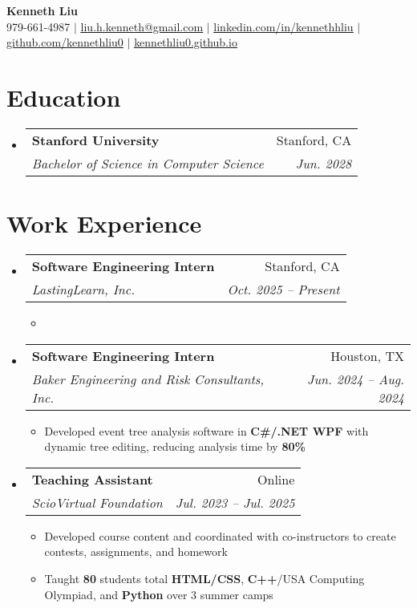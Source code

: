 \documentclass[letterpaper,11pt]{article}
\makeatletter
\newcommand{\resumeItem}[1]{
  \item\small{
    {#1 \vspace{-2pt}}
  }
}
\newcommand{\resumeSubheading}[4]{
  \vspace{-2pt}\item
    \begin{tabular*}{0.97\textwidth}[t]{l@{\extracolsep{\fill}}r}
      \textbf{#1} & #2 \\
      \textit{\small#3} & \textit{\small #4} \\
    \end{tabular*}\vspace{-7pt}
}
\newcommand{\resumeSubHeadingListStart}{\begin{itemize}[leftmargin=0.15in, label={}]}
\newcommand{\resumeSubHeadingListEnd}{\end{itemize}}
\newcommand{\resumeItemListStart}{\begin{itemize}}
\newcommand{\resumeItemListEnd}{\end{itemize}\vspace{-5pt}}
\makeatother
\begin{document}

\begin{center}
    \textbf{\Huge  Kenneth Liu} \\ \vspace{1pt}
    \small 979-661-4987 $|$ \href{mailto:liu.h.kenneth@gmail.com}{\underline{liu.h.kenneth@gmail.com}} $|$ 
    \href{https://www.linkedin.com/in/kennethhliu}{\underline{linkedin.com/in/kennethhliu}}
    $|$ 
    \href{https://github.com/kennethliu0}{\underline{github.com/kennethliu0}} $|$ \href{https://kennethliu0.github.io}{\underline{kennethliu0.github.io}}
\end{center}


\section{Education}
  \resumeSubHeadingListStart
    \resumeSubheading
      {Stanford University}{Stanford, CA}
      {Bachelor of Science in Computer Science}{Jun. 2028}
  \resumeSubHeadingListEnd


\section{Work Experience}
  \resumeSubHeadingListStart
     \resumeSubheading
      {Software Engineering Intern}{Stanford, CA}
      {LastingLearn, Inc.}{Oct. 2025 -- Present}
      \resumeItemListStart
        \resumeItem{}
      \resumeItemListEnd
     \resumeSubheading
      {Software Engineering Intern}{Houston, TX}
      {Baker Engineering and Risk Consultants, Inc.}{Jun. 2024 -- Aug. 2024}
      \resumeItemListStart
        \resumeItem{Developed event tree analysis software in \textbf{C\#/.NET WPF} with dynamic tree editing, reducing analysis time by \textbf{80\%}}
      \resumeItemListEnd
    \resumeSubheading
      {Teaching Assistant}{Online}
      {ScioVirtual Foundation}{Jul. 2023 -- Jul. 2025}
      \resumeItemListStart
        \resumeItem{Developed course content and coordinated with co-instructors to create contests, assignments, and homework}
        \resumeItem{Taught \textbf{80} students total \textbf{HTML/CSS}, \textbf{C++}/USA Computing Olympiad, and \textbf{Python} over 3 summer camps}
      \resumeItemListEnd
  \resumeSubHeadingListEnd
\end{document}
